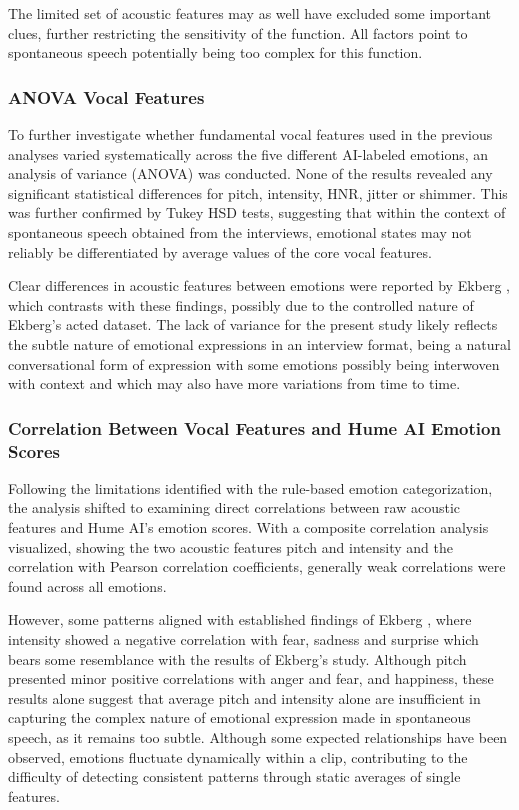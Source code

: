 The limited set of acoustic features may as well have excluded some important clues, further restricting the sensitivity of the function. All factors point to spontaneous speech potentially being too complex for this function.

\subsubsection{ANOVA Vocal Features}
To further investigate whether fundamental vocal features used in the previous analyses varied systematically across the five different AI-labeled emotions, an analysis of variance (ANOVA) was conducted. None of the results revealed any significant statistical differences for pitch, intensity, HNR, jitter or shimmer. This was further confirmed by Tukey HSD tests, suggesting that within the context of spontaneous speech obtained from the interviews, emotional states may not reliably be differentiated by average values of the core vocal features.

Clear differences in acoustic features between emotions were reported by Ekberg \autocite{Ekberg2023}, which contrasts with these findings, possibly due to the controlled nature of Ekberg’s acted dataset.
The lack of variance for the present study likely reflects the subtle nature of emotional expressions in an interview format, being a natural conversational form of expression with some emotions possibly being interwoven with context and which may also have more variations from time to time.

\subsubsection{Correlation Between Vocal Features and Hume AI Emotion Scores}
Following the limitations identified with the rule-based emotion categorization, the analysis shifted to examining direct correlations between raw acoustic features and Hume AI’s emotion scores. 
With a composite correlation analysis visualized, showing the two acoustic features pitch and intensity and the correlation with Pearson correlation coeﬀicients, generally weak correlations were found across all emotions. 

However, some patterns aligned with established findings of Ekberg \autocite{Ekberg2023}, where intensity showed a negative correlation with fear, sadness and surprise which bears some resemblance with the results of Ekberg’s study. Although pitch presented minor positive correlations with anger and fear, and happiness, these results alone suggest that average pitch and intensity alone are insufficient in capturing the complex nature of emotional expression made in spontaneous speech, as it remains too subtle. Although some expected relationships have been observed, emotions fluctuate dynamically within a clip, contributing to the difficulty of detecting consistent patterns through static averages of single features.

